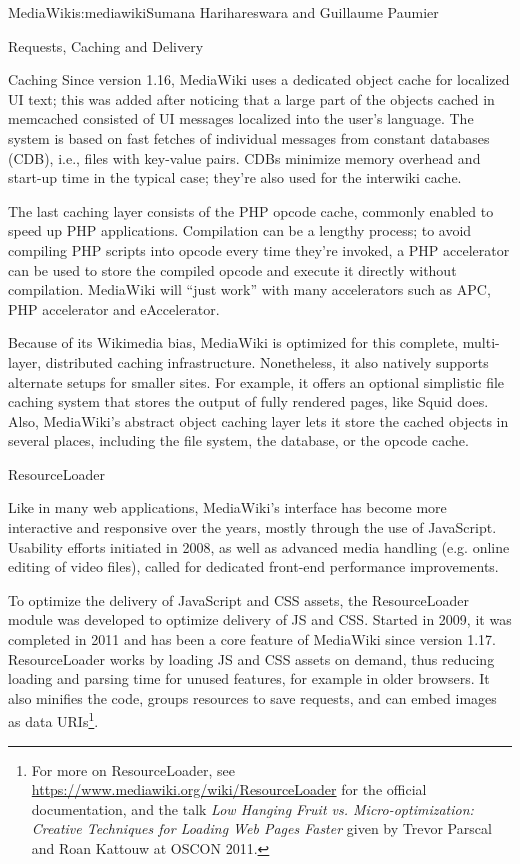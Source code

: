 \begin{aosachapter}{MediaWiki}{s:mediawiki}{Sumana Harihareswara and Guillaume Paumier}
\begin{aosasect1}{Requests, Caching and Delivery}
\begin{aosasect2}{Caching}
Since version 1.16, MediaWiki uses a dedicated object cache for
localized UI text; this was added after noticing that a large part of
the objects cached in memcached consisted of UI messages localized
into the user's language. The system is based on fast fetches of
individual messages from constant databases (CDB), i.e., files with
key-value pairs. CDBs minimize memory overhead and start-up time in
the typical case; they're also used for the interwiki cache.

The last caching layer consists of the PHP opcode cache, commonly
enabled to speed up PHP applications. Compilation can be a lengthy
process; to avoid compiling PHP scripts into opcode every time they're
invoked, a PHP accelerator can be used to store the compiled opcode
and execute it directly without compilation. MediaWiki will ``just
work'' with many accelerators such as APC, PHP accelerator and
eAccelerator.

Because of its Wikimedia bias, MediaWiki is optimized for this
complete, multi-layer, distributed caching
infrastructure. Nonetheless, it also natively supports alternate
setups for smaller sites. For example, it offers an optional
simplistic file caching system that stores the output of fully
rendered pages, like Squid does. Also, MediaWiki's abstract object
caching layer lets it store the cached objects in several places,
including the file system, the database, or the opcode cache.

\end{aosasect2}

\begin{aosasect2}{ResourceLoader}

Like in many web applications, MediaWiki's interface has become more
interactive and responsive over the years, mostly through the use of
JavaScript. Usability efforts initiated in 2008, as well as advanced
media handling (e.g. online editing of video files), called for
dedicated front-end performance improvements.

To optimize the delivery of JavaScript and CSS assets, the
ResourceLoader module was developed to optimize delivery of JS and
CSS. Started in 2009, it was completed in 2011 and has been a core
feature of MediaWiki since version 1.17. ResourceLoader works by
loading JS and CSS assets on demand, thus reducing loading and parsing
time for unused features, for example in older browsers. It also
minifies the code, groups resources to save requests, and can embed
images as data URIs\footnote{For more on ResourceLoader, see
  \url{https://www.mediawiki.org/wiki/ResourceLoader} for the official
  documentation, and the talk \emph{Low Hanging Fruit
    vs. Micro-optimization: Creative Techniques for Loading Web Pages
    Faster} given by Trevor Parscal and Roan Kattouw at OSCON 2011.}.


\end{aosasect2}
\end{aosasect1}
\end{aosachapter}
